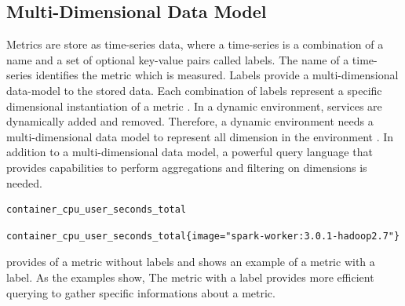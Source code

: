 \subsection{Multi-Dimensional Data Model}
\label{subsec:02_monitoring_db_multi-model}
Metrics are store as time-series data, where a time-series is a combination of a name and a set of optional key-value pairs called labels.
The name of a time-series identifies the metric which is measured.
Labels provide a multi-dimensional data-model to the stored data. Each combination of labels represent a specific dimensional instantiation of a metric \cite{Prom2020Docs}.
In a dynamic environment, services are dynamically added and removed. Therefore, a dynamic environment needs a multi-dimensional data model to represent all dimension in the environment \cite{Farcic2018Toolkit22}.
In addition to a multi-dimensional data model, a powerful query language that provides capabilities to perform aggregations and filtering on dimensions is needed.
\begin{lstlisting}[label=lst:02_monitoring_db_multi-model_metr_dimless, caption=Example of a dimensionless-metric, numbers=none]
container_cpu_user_seconds_total
\end{lstlisting}
\begin{lstlisting}[label=lst:02_monitoring_db_multi-model_metr_withdim, caption=Example of a metric with dimensions, numbers=none]
container_cpu_user_seconds_total{image="spark-worker:3.0.1-hadoop2.7"}
\end{lstlisting}
 provides of a metric without labels and  shows an example of a metric with a label. As the examples show, The metric with a label provides more efficient querying to gather specific informations about a metric.
